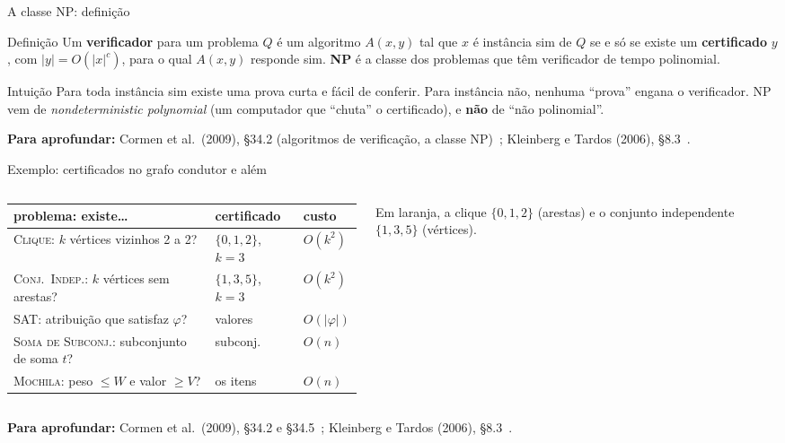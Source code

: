 \documentclass[aspectratio=169,xcolor=table]{beamer}
\newcommand{\arestashexa}{0/1, 1/2, 2/3, 3/4, 4/5, 5/0, 0/2}
\newcommand{\noshexa}{%
  \foreach \i in {0,...,5} \node[vert] (h\i) at ({90+60*\i}:0.95) {\i};
}
\newcommand{\hexa}[2]{%
  \noshexa
  \def\listaA{#2}\ifx\listaA\empty\else
    \foreach \u/\v in {#2} \draw[ares] (h\u) -- (h\v);\fi
  \foreach \u/\v in \arestashexa \draw[aresta] (h\u) -- (h\v);
  \def\listaV{#1}\ifx\listaV\empty\else
    \foreach \v in {#1} \node[vS] at (h\v) {\v};\fi
}
\newcommand{\fonte}[1]{%
  \vfill
  {\tiny\color{gray!55!black}\textbf{Para aprofundar:} #1\par}%
}
\newcommand{\prob}[1]{\textsc{#1}}
\begin{document}
\begin{frame}{A classe NP: definição}
  \begin{block}{Definição}
    \small
    Um \textbf{verificador} para um problema $Q$ é um algoritmo $A(x, y)$ tal que $x$ é
    instância sim de $Q$ se e só se existe um \textbf{certificado} $y$, com
    $|y| = O(|x|^c)$, para o qual $A(x,y)$ responde sim.
    \textbf{NP} é a classe dos problemas que têm verificador de tempo polinomial.
  \end{block}
  \begin{exampleblock}{Intuição}
    \scriptsize
    Para toda instância sim existe uma prova curta e fácil de conferir. Para instância não,
    nenhuma ``prova'' engana o verificador. NP vem de \emph{nondeterministic polynomial}
    (um computador que ``chuta'' o certificado), e \textbf{não} de ``não polinomial''.
  \end{exampleblock}
  \fonte{Cormen et al.\ (2009), \S 34.2 (algoritmos de verificação, a classe NP)~\cite{cormen2009introduction};
    Kleinberg e Tardos (2006), \S 8.3~\cite{kleinberg2006algorithm}.}
\end{frame}

\begin{frame}{Exemplo: certificados no grafo condutor e além}
  \begin{columns}[c]
    \begin{column}{0.72\textwidth}
      \scriptsize
      \begin{tabular}{lll}
        \toprule
        problema: existe\ldots & certificado & custo \\
        \midrule
        \prob{Clique}: $k$ vértices vizinhos 2 a 2? & $\{0,1,2\}$, $k=3$ & $O(k^2)$ \\
        \prob{Conj.\ Indep.}: $k$ vértices sem arestas? & $\{1,3,5\}$, $k=3$ & $O(k^2)$ \\
        \prob{SAT}: atribuição que satisfaz $\varphi$? & valores & $O(|\varphi|)$ \\
        \prob{Soma de Subconj.}: subconjunto de soma $t$? & subconj. & $O(n)$ \\
        \prob{Mochila}: peso $\le W$ e valor $\ge V$? & os itens & $O(n)$ \\
        \bottomrule
      \end{tabular}
    \end{column}
    \begin{column}{0.25\textwidth}
      \begin{center}
      \end{center}
      {\scriptsize Em laranja, a clique $\{0,1,2\}$ (arestas) e o conjunto independente
      $\{1,3,5\}$ (vértices).\par}
    \end{column}
  \end{columns}
  \fonte{Cormen et al.\ (2009), \S 34.2 e \S 34.5~\cite{cormen2009introduction};
    Kleinberg e Tardos (2006), \S 8.3~\cite{kleinberg2006algorithm}.}
\end{frame}
\end{document}
